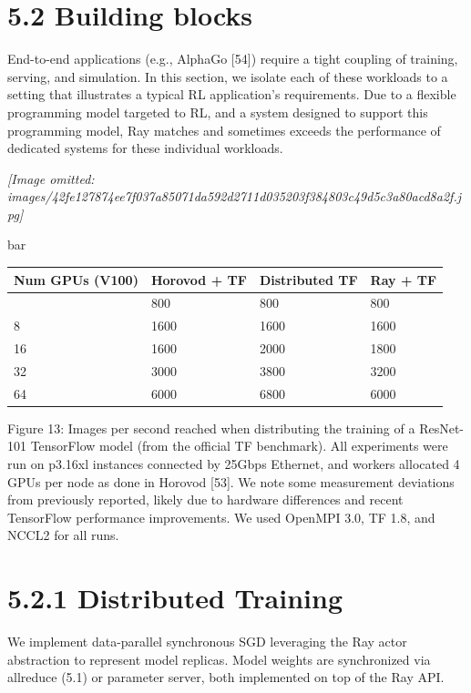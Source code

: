 \documentclass[
]{article}
\newcounter{none} %
\begin{document}
\section{5.2 Building blocks}\label{building-blocks}

End-to-end applications (e.g., AlphaGo {[}54{]}) require a tight
coupling of training, serving, and simulation. In this section, we
isolate each of these workloads to a setting that illustrates a typical
RL application's requirements. Due to a flexible programming model
targeted to RL, and a system designed to support this programming model,
Ray matches and sometimes exceeds the performance of dedicated systems
for these individual workloads.

\textit{[Image omitted: images/42fe127874ee7f037a85071da592d2711d035203f384803c49d5c3a80acd8a2f.jpg]}

bar

{\def\LTcaptype{none} %
\begin{longtable}[]{@{}llll@{}}
\toprule\noalign{}
Num GPUs (V100) & Horovod + TF & Distributed TF & Ray + TF \\
\midrule\noalign{}
\endhead
\bottomrule\noalign{}
\endlastfoot
4 & 800 & 800 & 800 \\
8 & 1600 & 1600 & 1600 \\
16 & 1600 & 2000 & 1800 \\
32 & 3000 & 3800 & 3200 \\
64 & 6000 & 6800 & 6000 \\
\end{longtable}
}

Figure 13: Images per second reached when distributing the training of a
ResNet-101 TensorFlow model (from the official TF benchmark). All
experiments were run on p3.16xl instances connected by 25Gbps Ethernet,
and workers allocated 4 GPUs per node as done in Horovod {[}53{]}. We
note some measurement deviations from previously reported, likely due to
hardware differences and recent TensorFlow performance improvements. We
used OpenMPI 3.0, TF 1.8, and NCCL2 for all runs.

\section{5.2.1 Distributed Training}\label{distributed-training}

We implement data-parallel synchronous SGD leveraging the Ray actor
abstraction to represent model replicas. Model weights are synchronized
via allreduce (5.1) or parameter server, both implemented on top of the
Ray API.
\end{document}
